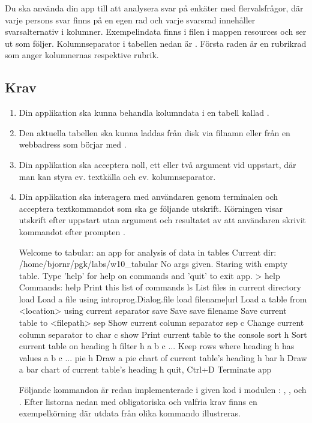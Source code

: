 Du ska använda din app till att analysera svar på enkäter med flervalsfrågor, där varje persons svar finns på en egen rad och varje svarsrad innehåller svarsalternativ i kolumner.
Exempelindata finns i filen  i mappen resources och ser ut som följer. Kolumnseparator i tabellen nedan är . Första raden är en rubrikrad som anger kolumnernas respektive rubrik.


\subsection{Krav}

\begin{enumerate}[leftmargin=*]
\item Din applikation ska kunna behandla kolumndata i en tabell kallad .

\item Den aktuella tabellen ska kunna laddas från disk via filnamn eller från en webbadress som börjar med .

\item Din applikation ska acceptera noll, ett eller två argument vid uppstart, där man kan styra ev. textkälla och ev. kolumnseparator.

\item Din applikation ska interagera med användaren genom terminalen och acceptera textkommandot  som ska ge följande utskrift. Körningen visar utskrift efter uppstart utan argument och resultatet av att användaren skrivit kommandot  efter prompten .

\begin{REPLnonum}
Welcome to tabular: an app for analysis of data in tables
Current dir: /home/bjornr/pgk/labs/w10_tabular
No args given. Staring with empty table.
Type 'help' for help on commands and 'quit' to exit app.
> help
Commands:
help                 Print this list of commands
ls                   List files in current directory
load                 Load a file using introprog.Dialog.file
load filename|url    Load a table from <location> using current separator
save                 Save
save filename        Save current table to <filepath>
sep                  Show current column separator
sep c                Change current column separator to char c
show                 Print current table to the console
sort h               Sort current table on heading h
filter h a b c ...   Keep rows where heading h has values a b c ...
pie h                Draw a pie chart of current table's heading h
bar h                Draw a bar chart of current table's heading h
quit, Ctrl+D         Terminate app
\end{REPLnonum}
Följande kommandon är redan implementerade i given kod i modulen : , ,  och . Efter listorna nedan med obligatoriska och valfria krav finns en exempelkörning där utdata från olika kommando illustreras.


\end{enumerate}
